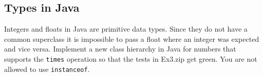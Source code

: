 \documentclass [11pt, a4wide, twoside]{article}
\begin{document}
%
%
%

\subsection{Types in Java}
Integers and floats in Java are primitive data types. Since they do not have a
common superclass it is impossible to pass a float where an integer was
expected and vice versa. Implement a new class hierarchy in Java for numbers
that supports the \verb$times$ operation so that the tests in Ex3.zip get green.
You are not allowed to use \verb$instanceof$.
\solution{}
%
%
%
\end{document}
